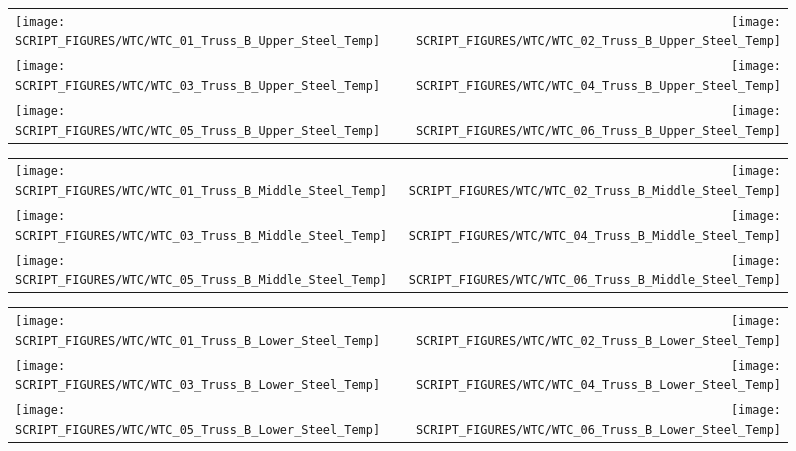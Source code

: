 \begin{figure}[p]
\begin{tabular*}{\textwidth}{l@{\extracolsep{\fill}}r}
\texttt{[image: SCRIPT\_FIGURES/WTC/WTC\_01\_Truss\_B\_Upper\_Steel\_Temp]} &
\texttt{[image: SCRIPT\_FIGURES/WTC/WTC\_02\_Truss\_B\_Upper\_Steel\_Temp]} \\
\texttt{[image: SCRIPT\_FIGURES/WTC/WTC\_03\_Truss\_B\_Upper\_Steel\_Temp]} &
\texttt{[image: SCRIPT\_FIGURES/WTC/WTC\_04\_Truss\_B\_Upper\_Steel\_Temp]} \\
\texttt{[image: SCRIPT\_FIGURES/WTC/WTC\_05\_Truss\_B\_Upper\_Steel\_Temp]} &
\texttt{[image: SCRIPT\_FIGURES/WTC/WTC\_06\_Truss\_B\_Upper\_Steel\_Temp]}
\end{tabular*}
\label{NIST_WTC_Truss_B_Upper_Steel_Temp}
\end{figure}

\begin{figure}[p]
\begin{tabular*}{\textwidth}{l@{\extracolsep{\fill}}r}
\texttt{[image: SCRIPT\_FIGURES/WTC/WTC\_01\_Truss\_B\_Middle\_Steel\_Temp]} &
\texttt{[image: SCRIPT\_FIGURES/WTC/WTC\_02\_Truss\_B\_Middle\_Steel\_Temp]} \\
\texttt{[image: SCRIPT\_FIGURES/WTC/WTC\_03\_Truss\_B\_Middle\_Steel\_Temp]} &
\texttt{[image: SCRIPT\_FIGURES/WTC/WTC\_04\_Truss\_B\_Middle\_Steel\_Temp]} \\
\texttt{[image: SCRIPT\_FIGURES/WTC/WTC\_05\_Truss\_B\_Middle\_Steel\_Temp]} &
\texttt{[image: SCRIPT\_FIGURES/WTC/WTC\_06\_Truss\_B\_Middle\_Steel\_Temp]}
\end{tabular*}
\label{NIST_WTC_Truss_B_Middle_Steel_Temp}
\end{figure}

\begin{figure}[p]
\begin{tabular*}{\textwidth}{l@{\extracolsep{\fill}}r}
\texttt{[image: SCRIPT\_FIGURES/WTC/WTC\_01\_Truss\_B\_Lower\_Steel\_Temp]} &
\texttt{[image: SCRIPT\_FIGURES/WTC/WTC\_02\_Truss\_B\_Lower\_Steel\_Temp]} \\
\texttt{[image: SCRIPT\_FIGURES/WTC/WTC\_03\_Truss\_B\_Lower\_Steel\_Temp]} &
\texttt{[image: SCRIPT\_FIGURES/WTC/WTC\_04\_Truss\_B\_Lower\_Steel\_Temp]} \\
\texttt{[image: SCRIPT\_FIGURES/WTC/WTC\_05\_Truss\_B\_Lower\_Steel\_Temp]} &
\texttt{[image: SCRIPT\_FIGURES/WTC/WTC\_06\_Truss\_B\_Lower\_Steel\_Temp]}
\end{tabular*}
\label{NIST_WTC_Truss_B_Lower_Steel_Temp}
\end{figure}


